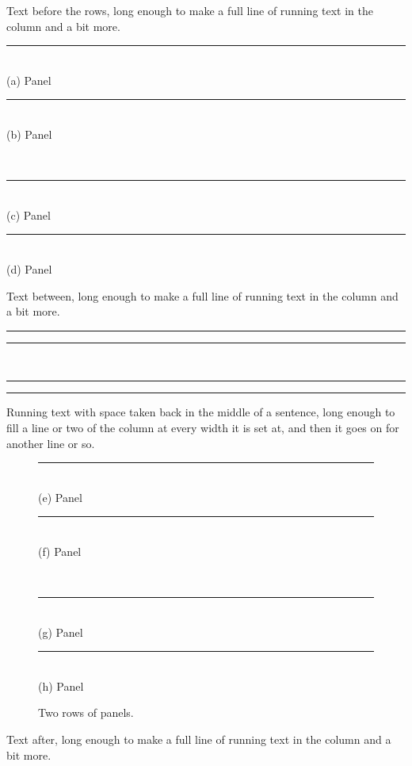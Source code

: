 \documentclass{article}
\newcommand\panel[1]{\parbox[b]{3cm}{\centering\rule{3cm}{1.5cm}\\ (#1) Panel}}
\begin{document}
Text before the rows, long enough to make a full line of running text in the column and a bit more.

\begin{center}
\panel{a}\hspace{-5mm}\panel{b}
\\ \vspace{-0.35cm}
\panel{c}\hspace{-5mm}\panel{d}
\end{center}
Text between, long enough to make a full line of running text in the column and a bit more.

\noindent\rule{3cm}{1cm}\hspace{-5mm}\rule{3cm}{1cm}\\ \vspace{-0.25cm}
\rule{3cm}{1cm}\hspace{-5mm}\rule{3cm}{1cm}

Running text with space taken back in the middle of a sentence, long enough to fill a line or two
of the column at every width\vspace{-2pt} it is set at, and then it goes on for another line or so.
\begin{figure}[h]
\centering
\panel{e}\hspace{-5mm}\panel{f}
\\ \vspace{-0.35cm}
\panel{g}\hspace{-5mm}\panel{h}
\caption{Two rows of panels.}
\end{figure}
Text after, long enough to make a full line of running text in the column and a bit more.
\end{document}
